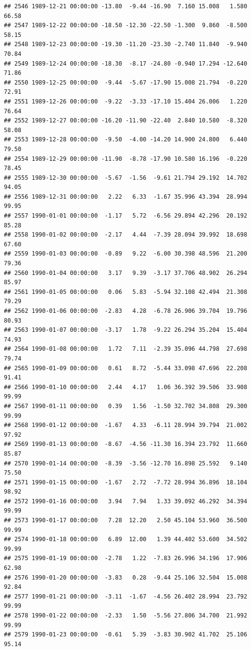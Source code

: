 \documentclass{article}\usepackage{graphicx, color}
\makeatletter
\newenvironment{kframe}{%
 \def\at@end@of@kframe{}%
 \ifinner\ifhmode%
  \def\at@end@of@kframe{\end{minipage}}%
  \begin{minipage}{\columnwidth}%
 \fi\fi%
 \def\FrameCommand##1{\hskip\@totalleftmargin \hskip-\fboxsep
 \colorbox{shadecolor}{##1}\hskip-\fboxsep
     \hskip-\linewidth \hskip-\@totalleftmargin \hskip\columnwidth}%
 \MakeFramed {\advance\hsize-\width
   \@totalleftmargin\z@ \linewidth\hsize
   \@setminipage}}%
 {\par\unskip\endMakeFramed%
 \at@end@of@kframe}
\newenvironment{knitrout}{}{} %
\makeatother
\begin{document}
\begin{knitrout}
\begin{kframe}
\begin{verbatim}
## 2546 1989-12-21 00:00:00 -13.80  -9.44 -16.90  7.160 15.008   1.580  66.58
## 2547 1989-12-22 00:00:00 -18.50 -12.30 -22.50 -1.300  9.860  -8.500  58.15
## 2548 1989-12-23 00:00:00 -19.30 -11.20 -23.30 -2.740 11.840  -9.940  70.84
## 2549 1989-12-24 00:00:00 -18.30  -8.17 -24.80 -0.940 17.294 -12.640  71.86
## 2550 1989-12-25 00:00:00  -9.44  -5.67 -17.90 15.008 21.794  -0.220  72.91
## 2551 1989-12-26 00:00:00  -9.22  -3.33 -17.10 15.404 26.006   1.220  76.64
## 2552 1989-12-27 00:00:00 -16.20 -11.90 -22.40  2.840 10.580  -8.320  58.08
## 2553 1989-12-28 00:00:00  -9.50  -4.00 -14.20 14.900 24.800   6.440  79.50
## 2554 1989-12-29 00:00:00 -11.90  -8.78 -17.90 10.580 16.196  -0.220  78.45
## 2555 1989-12-30 00:00:00  -5.67  -1.56  -9.61 21.794 29.192  14.702  94.05
## 2556 1989-12-31 00:00:00   2.22   6.33  -1.67 35.996 43.394  28.994  99.95
## 2557 1990-01-01 00:00:00  -1.17   5.72  -6.56 29.894 42.296  20.192  85.28
## 2558 1990-01-02 00:00:00  -2.17   4.44  -7.39 28.094 39.992  18.698  67.60
## 2559 1990-01-03 00:00:00  -0.89   9.22  -6.00 30.398 48.596  21.200  79.36
## 2560 1990-01-04 00:00:00   3.17   9.39  -3.17 37.706 48.902  26.294  85.97
## 2561 1990-01-05 00:00:00   0.06   5.83  -5.94 32.108 42.494  21.308  79.29
## 2562 1990-01-06 00:00:00  -2.83   4.28  -6.78 26.906 39.704  19.796  80.93
## 2563 1990-01-07 00:00:00  -3.17   1.78  -9.22 26.294 35.204  15.404  74.93
## 2564 1990-01-08 00:00:00   1.72   7.11  -2.39 35.096 44.798  27.698  79.74
## 2565 1990-01-09 00:00:00   0.61   8.72  -5.44 33.098 47.696  22.208  91.41
## 2566 1990-01-10 00:00:00   2.44   4.17   1.06 36.392 39.506  33.908  99.99
## 2567 1990-01-11 00:00:00   0.39   1.56  -1.50 32.702 34.808  29.300  99.99
## 2568 1990-01-12 00:00:00  -1.67   4.33  -6.11 28.994 39.794  21.002  97.92
## 2569 1990-01-13 00:00:00  -8.67  -4.56 -11.30 16.394 23.792  11.660  85.87
## 2570 1990-01-14 00:00:00  -8.39  -3.56 -12.70 16.898 25.592   9.140  75.50
## 2571 1990-01-15 00:00:00  -1.67   2.72  -7.72 28.994 36.896  18.104  98.92
## 2572 1990-01-16 00:00:00   3.94   7.94   1.33 39.092 46.292  34.394  99.99
## 2573 1990-01-17 00:00:00   7.28  12.20   2.50 45.104 53.960  36.500  99.99
## 2574 1990-01-18 00:00:00   6.89  12.00   1.39 44.402 53.600  34.502  99.99
## 2575 1990-01-19 00:00:00  -2.78   1.22  -7.83 26.996 34.196  17.906  62.98
## 2576 1990-01-20 00:00:00  -3.83   0.28  -9.44 25.106 32.504  15.008  92.84
## 2577 1990-01-21 00:00:00  -3.11  -1.67  -4.56 26.402 28.994  23.792  99.99
## 2578 1990-01-22 00:00:00  -2.33   1.50  -5.56 27.806 34.700  21.992  99.99
## 2579 1990-01-23 00:00:00  -0.61   5.39  -3.83 30.902 41.702  25.106  95.14

\end{verbatim}
\end{kframe}
\end{knitrout}
\end{document}
